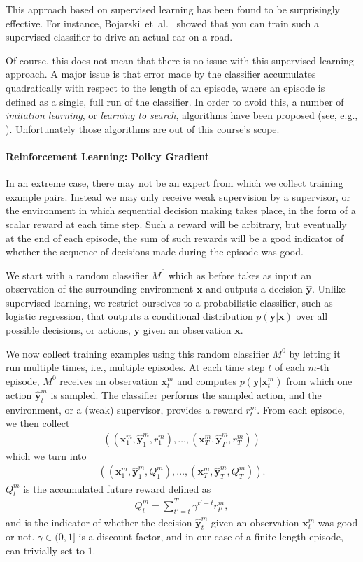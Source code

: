 \documentclass{report}
\newcommand{\vect}[1]{\mathbf{#1}}
\newcommand{\vx}[0]{\vect{x}}
\newcommand{\vy}[0]{\vect{y}}
\begin{document}
This approach based on supervised learning has been found to be surprisingly
effective. For instance, Bojarski~et~al.~\cite{bojarski2016end} showed that you
can train such a supervised classifier to drive an actual car on a road. 

Of course, this does not mean that there is no issue with this supervised
learning approach. A major issue is that error made by the classifier
accumulates quadratically with respect to the length of an episode, where an
episode is defined as a single, full run of the classifier. In order to avoid
this, a number of {\it imitation learning}, or {\it learning to search},
algorithms have been proposed (see, e.g., \cite{ross2011reduction}).
Unfortunately those algorithms are out of this course's scope.


\paragraph{Reinforcement Learning: Policy Gradient}

In an extreme case, there may not be an expert from which we collect training
example pairs. Instead we may only receive weak supervision by a supervisor, or
the environment in which sequential decision making takes place, in the form of
a scalar reward at each time step. Such a reward will be arbitrary, but
eventually at the end of each episode, the sum of such rewards will be a good
indicator of whether the sequence of decisions made during the episode was good.

We start with a random classifier $M^0$ which as before takes as input an
observation of the surrounding environment $\vx$ and outputs a decision
$\hat{\vy}$. Unlike supervised learning, we restrict ourselves to a
probabilistic classifier, such as logistic regression, that outputs a
conditional distribution $p(\vy | \vx)$ over all possible decisions, or actions,
$\vy$ given an observation $\vx$. 

We now collect training examples using this random classifier $M^0$ by letting
it run multiple times, i.e., multiple episodes. At each time step $t$ of each
$m$-th episode, $M^0$ receives an observation $\vx_t^m$ and computes $p(\vy |
\vx_t^m)$ from which one action $\hat{\vy}_t^m$ is sampled. The classifier
performs the sampled action, and the environment, or a (weak) supervisor,
provides a reward $r_t^m$. From each episode, we then collect
\begin{align*}
    ((\vx_1^m, \hat{\vy}_1^m, r_1^m), \ldots, (\vx_T^m, \hat{\vy}_T^m, r_T^m))
\end{align*}
which we turn into
\begin{align*}
    ((\vx_1^m, \hat{\vy}_1^m, Q_1^m), \ldots, (\vx_T^m, \hat{\vy}_T^m, Q_T^m)).
\end{align*}
$Q_t^m$ is the accumulated future reward defined as
\begin{align*}
    Q_t^m = \sum_{t'=t}^T \gamma^{t'-t} r_{t'}^m,
\end{align*}
and is the indicator of whether the decision $\hat{\vy}_t^m$ given an
observation $\vx_t^m$ was good or not. $\gamma \in ( 0, 1 ]$ is a discount
factor, and in our case of a finite-length episode, can trivially set to $1$.
\end{document}
